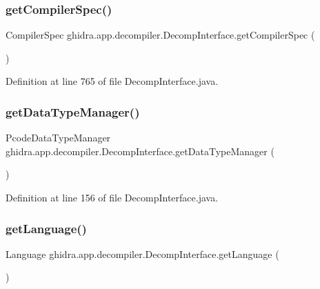 \subsubsection{\texorpdfstring{getCompilerSpec()}{getCompilerSpec()}}
{\footnotesize\ttfamily Compiler\+Spec ghidra.\+app.\+decompiler.\+Decomp\+Interface.\+get\+Compiler\+Spec (\begin{DoxyParamCaption}{ }\end{DoxyParamCaption})\hspace{0.3cm}{\ttfamily [inline]}}



Definition at line 765 of file Decomp\+Interface.\+java.

\mbox{\label{classghidra_1_1app_1_1decompiler_1_1_decomp_interface_ab3fcaca7d6965b145c3d4b6041df2d05}} 
\subsubsection{\texorpdfstring{getDataTypeManager()}{getDataTypeManager()}}
{\footnotesize\ttfamily Pcode\+Data\+Type\+Manager ghidra.\+app.\+decompiler.\+Decomp\+Interface.\+get\+Data\+Type\+Manager (\begin{DoxyParamCaption}{ }\end{DoxyParamCaption})\hspace{0.3cm}{\ttfamily [inline]}}



Definition at line 156 of file Decomp\+Interface.\+java.

\mbox{\label{classghidra_1_1app_1_1decompiler_1_1_decomp_interface_a7ed2bb195a7664d9be736016d0daa19d}} 
\subsubsection{\texorpdfstring{getLanguage()}{getLanguage()}}
{\footnotesize\ttfamily Language ghidra.\+app.\+decompiler.\+Decomp\+Interface.\+get\+Language (\begin{DoxyParamCaption}{ }\end{DoxyParamCaption})\hspace{0.3cm}{\ttfamily [inline]}}



